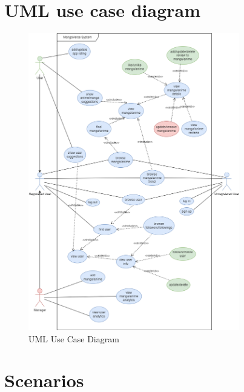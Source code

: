\section{UML use case diagram}
\begin{figure}[h]
    \centering
    \includegraphics[width=0.82\textwidth]{Media/useCase.png}
    \caption{UML Use Case Diagram}
    \label{uml use case diagram}
\end{figure}

\newpage

\section{Scenarios}

\renewcommand{\arraystretch}{1.5}
\setlength{\arrayrulewidth}{1pt} %

